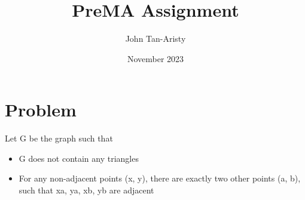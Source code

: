 \documentclass{article}
\title{PreMA Assignment}
\author{John Tan-Aristy}
\date{November 2023}
\begin{document}
\maketitle

\section{Problem}
Let G be the graph such that
\begin{itemize}
    \item G does not contain any triangles
    \item For any non-adjacent points (x, y), there are exactly two other points (a, b), such that xa, ya, xb, yb are adjacent
\end{itemize}
\end{document}
